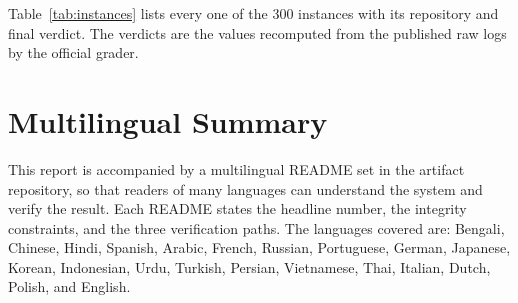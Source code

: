 \documentclass[11pt,a4paper]{article}
\begin{document}
Table~\ref{tab:instances} lists every one of the 300 instances with its repository and
final verdict. The verdicts are the values recomputed from the published raw logs by the
official grader.



\section{Multilingual Summary}
\label{sec:multilingual}

This report is accompanied by a multilingual README set in the artifact repository, so
that readers of many languages can understand the system and verify the result. Each
README states the headline number, the integrity constraints, and the three verification
paths. The languages covered are: Bengali, Chinese, Hindi, Spanish, Arabic, French,
Russian, Portuguese, German, Japanese, Korean, Indonesian, Urdu, Turkish, Persian,
Vietnamese, Thai, Italian, Dutch, Polish, and English.
\end{document}

